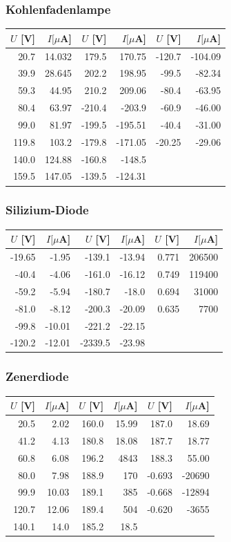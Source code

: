 \documentclass[12pt,a4paper]{article}
\begin{document}
\subsubsection*{Kohlenfadenlampe}
\begin{tabular}{|r|r|r|r|r|r|}
\hline
$U$ [V]&$I [\mu $A]&$U$ [V]&$I [\mu $A]&$U$ [V]&$I [\mu $A]\\
\hline
20.7&14.032&179.5&170.75&-120.7&-104.09\\
39.9&28.645&202.2&198.95&-99.5&-82.34\\
59.3&44.95&210.2&209.06&-80.4&-63.95\\
80.4&63.97&-210.4&-203.9&-60.9&-46.00\\
99.0&81.97&-199.5&-195.51&-40.4&-31.00\\
119.8&103.2&-179.8&-171.05&-20.25&-29.06\\
140.0&124.88&-160.8&-148.5&&\\
159.5&147.05&-139.5&-124.31&&\\
\hline
\end{tabular}

\subsubsection*{Silizium-Diode}
\begin{tabular}{|r|r|r|r|r|r|}
\hline
$U$ [V]&$I [\mu $A]&$U$ [V]&$I [\mu $A]&$U$ [V]&$I [\mu $A]\\
\hline
-19.65&-1.95&-139.1&-13.94&0.771&206500\\
-40.4&-4.06&-161.0&-16.12&0.749&119400\\
-59.2&-5.94&-180.7&-18.0&0.694&31000\\
-81.0&-8.12&-200.3&-20.09&0.635&7700\\
-99.8&-10.01&-221.2&-22.15&&\\
-120.2&-12.01&-2339.5&-23.98&&\\
\hline
\end{tabular}

\subsubsection*{Zenerdiode}
\begin{tabular}{|r|r|r|r|r|r|}
\hline
$U$ [V]&$I [\mu $A]&$U$ [V]&$I [\mu $A]&$U$ [V]&$I [\mu $A]\\
\hline
20.5&2.02&160.0&15.99&187.0&18.69\\
41.2&4.13&180.8&18.08&187.7&18.77\\
60.8&6.08&196.2&4843&188.3&55.00\\
80.0&7.98&188.9&170&-0.693&-20690\\
99.9&10.03&189.1&385&-0.668&-12894\\
120.7&12.06&189.4&504&-0.620&-3655\\
140.1&14.0&185.2&18.5&&\\
\hline
\end{tabular}
\end{document}
